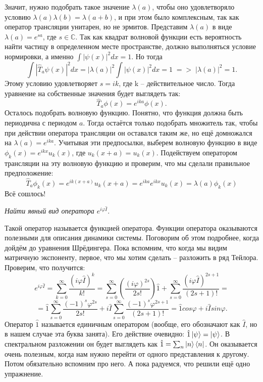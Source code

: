 Значит, нужно подобрать такое значение $\lambda(a)$, чтобы оно удовлетворяло условию $\lambda(a)\lambda(b) = \lambda(a+b)$, и при этом было комплексным, так как оператор трансляции унитарен, но не эрмитов. Представим $\lambda(a)$ в виде $\lambda(a) = e^{sa}$, где $s\in \mathbb{C}$.
Так как квадрат волновой функции есть вероятность найти частицу в определенном месте пространстве, должно выполняться условие нормировки, а именно $\int |\psi(x)|^2 dx = 1$. Но тогда 
\[
\int |\hat{T}_a\psi(x)|^2 dx = |\lambda(a)|^2\int |\psi(x)|^2 dx = 1\; => \; |\lambda(a)|^2 = 1.
\]
Этому условию удовлетворяет $s = ik$, где k -- действительное число. Тогда уравнение на собственные значения будет выглядеть так:
\[
\hat{T}_{a}\phi(x) = e^{ika}\phi(x).
\]
Осталось подобрать волновую функцию. Понятно, что функция должна быть периодична с периодом $a$. Тогда остаётся только подобрать множитель так, чтобы при действии оператора трансляции он оставался таким же, но ещё домножался на $\lambda(a) = e^{ika}$. Учитывая эти предпосылки, выберем волновую функцию в виде $\phi_k(x) = e^{ikx}u_k(x)$, где $u_k(x + a) = u_k(x)$. Подействуем оператором трансляции на эту волновую функцию и проверим, что мы сделали правильное предположение:
\[
\hat T_a \phi_k(x) = e^{ik(x+a)}u_k(x+a) = e^{ika}e^{ikx}u_k(x) = \lambda(a) \phi_k(x)
\]
Всё сошлось!
\newpage
{}
\begin{center}
\textit{Найти явный вид оператора $e^{i\varphi\hat I}$}.
\end{center}
Такой оператор называется функцией оператора. Функции оператора оказываются полезными для описания динамики системы. Поговорим об этом подробнее, когда дойдём до уравнения Шрёдингера. Пока вспомним, что когда мы видим матричную экспоненту, первое, что мы хотим сделать -- разложить в ряд Тейлора. Проверим, что получится:
\[
e^{i\varphi\hat I} = \sum\limits_{k=0}^{\infty} \frac{(i\varphi\hat I)^k}{k!} = \sum\limits_{s=0}^{\infty} (\frac{(i\varphi)^{2s}}{2s!})\hat 1 + \sum\limits_{s=0}^{\infty} \frac{(i\varphi\hat I)^{2s+1}}{(2s+1)!} = 
\]
\[
=\hat 1 \sum\limits_{s=0}^{\infty} \frac{(-1)^s\varphi^{2s}}{2s!} + i\hat I \sum\limits_{s=0}^{\infty} \frac{(-1)^{s}\varphi^{2s+1}}{(2s+1)!} = \hat 1 cos\varphi + i\hat I sin \varphi.
\]
Оператор $\hat{1}$ называется единичным оператором (вообще, его обозначают как $\hat{I}$, но в нашем случае эта буква занята). Его действие очевидно: $\hat{1}\ket{\psi} = \ket{\psi}$. В спектральном разложении он будет выглядеть как $\hat{1} = \sum_n \ket{n}\bra{n}$. Он оказывается очень полезным, когда нам нужно перейти от одного представления к другому. Потом обязательно вспомним про него. А пока радуемся, что решили ещё одно упражнение.
